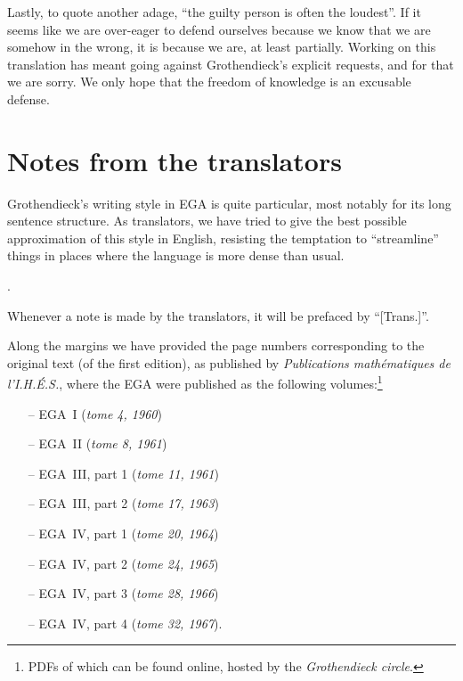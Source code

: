 Lastly, to quote another adage, ``the guilty person is often the loudest''.
If it seems like we are over-eager to defend ourselves because we know that we are somehow in the wrong, it is because we are, at least partially.
Working on this translation has meant going against Grothendieck's explicit requests, and for that we are sorry.
We only hope that the freedom of knowledge is an excusable defense.

\section*{Notes from the translators}

Grothendieck's writing style in EGA is quite particular, most notably for its long sentence structure.
As translators, we have tried to give the best possible approximation of this style in English, resisting the temptation to ``streamline'' things in places where the language is more dense than usual.

\sectionbreak

.

\sectionbreak

Whenever a note is made by the translators, it will be prefaced by ``[Trans.]''.

\sectionbreak

Along the margins we have provided the page numbers corresponding to the original text (of the first edition), as published by \emph{Publications math\'ematiques de l'I.H.\'E.S.}, where the EGA were published as the following volumes:\footnote{PDFs of which can be found online, hosted by the \emph{Grothendieck circle}.}
\begin{enumerate}
  \item[--] EGA~I (\emph{tome 4, 1960})
  \item[--] EGA~II (\emph{tome 8, 1961})
  \item[--] EGA~III, part 1 (\emph{tome 11, 1961})
  \item[--] EGA~III, part 2 (\emph{tome 17, 1963})
  \item[--] EGA~IV, part 1 (\emph{tome 20, 1964})
  \item[--] EGA~IV, part 2 (\emph{tome 24, 1965})
  \item[--] EGA~IV, part 3 (\emph{tome 28, 1966})
  \item[--] EGA~IV, part 4 (\emph{tome 32, 1967}).
\end{enumerate}

